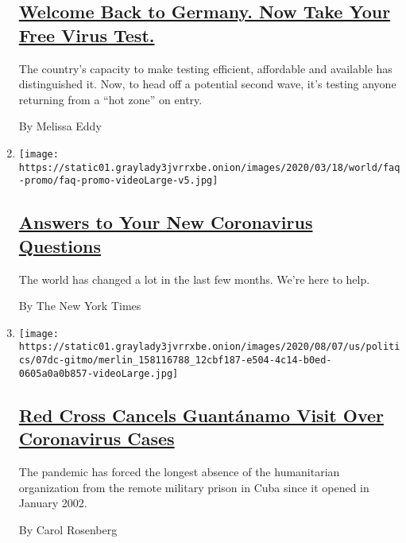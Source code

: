 \begin{enumerate}
  \hypertarget{welcome-back-to-germany-now-take-your-free-virus-test}{%
  \subsection{\texorpdfstring{\href{/2020/08/05/world/europe/germany-coronavirus-test-travelers.html}{Welcome
  Back to Germany. Now Take Your Free Virus
  Test.}}{Welcome Back to Germany. Now Take Your Free Virus Test.}}\label{welcome-back-to-germany-now-take-your-free-virus-test}}

  The country's capacity to make testing efficient, affordable and
  available has distinguished it. Now, to head off a potential second
  wave, it's testing anyone returning from a ``hot zone'' on entry.

  By Melissa Eddy
\item
  \texttt{[image: https://static01.graylady3jvrrxbe.onion/images/2020/03/18/world/faq-promo/faq-promo-videoLarge-v5.jpg]}

  \hypertarget{answers-to-your-new-coronavirus-questions}{%
  \subsection{\texorpdfstring{\href{/interactive/2020/world/coronavirus-tips-advice.html}{Answers
  to Your New Coronavirus
  Questions}}{Answers to Your New Coronavirus Questions}}\label{answers-to-your-new-coronavirus-questions}}

  The world has changed a lot in the last few months. We're here to
  help.

  By The New York Times
\item
  \texttt{[image: https://static01.graylady3jvrrxbe.onion/images/2020/08/07/us/politics/07dc-gitmo/merlin\_158116788\_12cbf187-e504-4c14-b0ed-0605a0a0b857-videoLarge.jpg]}

  \hypertarget{red-cross-cancels-guantuxe1namo-visit-over-coronavirus-cases}{%
  \subsection{\texorpdfstring{\href{/2020/08/07/us/politics/red-cross-guantanamo-coronavirus.html}{Red
  Cross Cancels Guantánamo Visit Over Coronavirus
  Cases}}{Red Cross Cancels Guantánamo Visit Over Coronavirus Cases}}\label{red-cross-cancels-guantuxe1namo-visit-over-coronavirus-cases}}

  The pandemic has forced the longest absence of the humanitarian
  organization from the remote military prison in Cuba since it opened
  in January 2002.

  By Carol Rosenberg
\end{enumerate}

